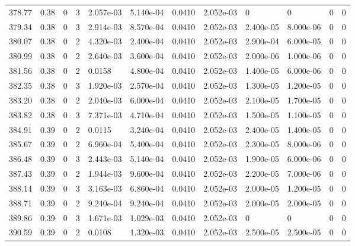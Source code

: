 \documentclass[preview]{standalone}
\begin{document}
{{{{{{{{{{{{{\begin{tabular}{L{1.2cm}C{1.2cm} C{0.3cm}C{0.5cm} C{1.4cm}C{1.4cm} C{1.4cm}C{1.4cm} C{1.6cm}C{1.6cm} C{1.6cm}C{1.6cm}}
  378.77  &  0.38  & 0     &  3 &  2.057e-03  & 5.140e-04  &  0.0410&   2.052e-03& 0 & 0   &  0 & 0  \\ 
  379.34  &  0.38  & 0     &  3 &  2.914e-03  & 8.570e-04  &  0.0410&   2.052e-03& 2.400e-05 & 8.000e-06   &  0 & 0  \\ 
  380.07  &  0.38  & 0     &  2 &  4.320e-03  & 2.400e-04  &  0.0410&   2.052e-03& 2.900e-04 & 6.000e-05   &  0 & 0  \\ 
  380.99  &  0.38  & 0     &  2 &  2.640e-03  & 3.600e-04  &  0.0410&   2.052e-03& 2.000e-06 & 1.000e-06   &  0 & 0  \\ 
  381.56  &  0.38  & 0     &  2 &  0.0158  & 4.800e-04  &  0.0410&   2.052e-03& 1.400e-05 & 6.000e-06   &  0 & 0  \\ 
  382.35  &  0.38  & 0     &  3 &  1.920e-03  & 2.570e-04  &  0.0410&   2.052e-03& 1.300e-05 & 1.200e-05   &  0 & 0  \\ 
  383.20  &  0.38  & 0     &  2 &  2.040e-03  & 6.000e-04  &  0.0410&   2.052e-03& 2.100e-05 & 1.700e-05   &  0 & 0  \\ 
  383.82  &  0.38  & 0     &  3 &  7.371e-03  & 4.710e-04  &  0.0410&   2.052e-03& 1.500e-05 & 1.100e-05   &  0 & 0  \\ 
  384.91  &  0.39  & 0     &  2 &  0.0115  & 3.240e-04  &  0.0410&   2.052e-03& 2.400e-05 & 1.400e-05   &  0 & 0  \\ 
  385.67  &  0.39  & 0     &  2 &  6.960e-04  & 5.400e-04  &  0.0410&   2.052e-03& 2.300e-05 & 8.000e-06   &  0 & 0  \\ 
  386.48  &  0.39  & 0     &  3 &  2.443e-03  & 5.140e-04  &  0.0410&   2.052e-03& 1.900e-05 & 6.000e-06   &  0 & 0  \\ 
  387.43  &  0.39  & 0     &  2 &  1.944e-03  & 9.600e-04  &  0.0410&   2.052e-03& 2.200e-05 & 7.000e-06   &  0 & 0  \\ 
  388.14  &  0.39  & 0     &  3 &  3.163e-03  & 6.860e-04  &  0.0410&   2.052e-03& 2.000e-05 & 1.200e-05   &  0 & 0  \\ 
  388.71  &  0.39  & 0     &  2 &  9.240e-04  & 9.240e-04  &  0.0410&   2.052e-03& 2.000e-05 & 2.000e-05   &  0 & 0  \\ 
  389.86  &  0.39  & 0     &  3 &  1.671e-03  & 1.029e-03  &  0.0410&   2.052e-03& 0 & 0   &  0 & 0  \\ 
  390.59  &  0.39  & 0     &  2 &  0.0108  & 1.320e-03  &  0.0410&   2.052e-03& 2.500e-05 & 2.500e-05   &  0 & 0  \\ 
\hline 
\end{tabular} 

}}}}}}}}}}}}}
\end{document}

